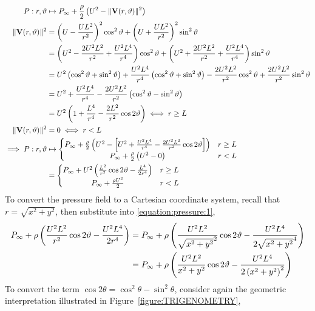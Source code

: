 \begin{align}
    \notag P:r,\theta&\mapsto P_\infty+\frac{\rho}{2}\left(U^2-\lVert\vec{V}(r,\theta)\rVert^2\right)\\
    \notag\lVert\vec{V}(r,\theta)\rVert^2&=\left(U-\frac{UL^2}{r^{2}}\right)^2\cos^2\theta+\left(U+\frac{UL^2}{r^{2}}\right)^2\sin^2\theta\\
    \notag&=\left(U^2-\frac{2U^2L^2}{r^2}+\frac{U^2L^4}{r^4}\right)\cos^2\theta+\left(U^2+\frac{2U^2L^2}{r^2}+\frac{U^2L^4}{r^4}\right)\sin^2\theta\\
    \notag&=U^2\left(\cos^2\theta+\sin^2\theta\right)+\frac{U^2L^4}{r^4}\left(\cos^2\theta+\sin^2\theta\right)-\frac{2U^2L^2}{r^2}\cos^2\theta+\frac{2U^2L^2}{r^2}\sin^2\theta\\
    \notag&=U^2+\frac{U^2L^4}{r^4}-\frac{2U^2L^2}{r^2}\left(\cos^2\theta-\sin^2\theta\right)\\
    \notag&=U^2\left(1+\frac{L^4}{r^4}-\frac{2L^2}{r^2}\cos2\theta\right)\iff r\geq L\\
    \notag\lVert\vec{V}(r,\theta)\rVert^2&=0\iff r<L\\
    \notag\implies P:r,\theta&\mapsto\left\{\begin{matrix}
        P_\infty+\frac{\rho}{2}\left(U^2-\left[U^2+\frac{U^2L^4}{r^4}-\frac{2U^2L^2}{r^2}\cos2\theta\right]\right) & r\geq L\\
        P_\infty+\frac{\rho}{2}\left(U^2-0\right) & r<L
    \end{matrix}\right.\\
    \label{equation:pressure:1}&=\left\{\begin{matrix}
        P_\infty+U^2\left(\frac{L^2}{r^2}\cos2\theta-\frac{L^4}{2r^4}\right) & r\geq L\\
        P_\infty+\frac{\rho U^2}{2} & r<L
    \end{matrix}\right.
\end{align}
To convert the pressure field to a Cartesian coordinate system, recall that $r=\sqrt{x^2+y^2}$, then substitute into \eqref{equation:pressure:1},
\begin{align}
    \notag P_\infty+\rho\left(\frac{U^2L^2}{r^2}\cos2\theta-\frac{U^2L^4}{2r^4}\right)&=P_\infty+\rho\left(\frac{U^2L^2}{\sqrt{x^2+y^2}^2}\cos2\theta-\frac{U^2L^4}{2\sqrt{x^2+y^2}^4}\right)\\
    \label{equation:pressure:2}&=P_\infty+\rho\left(\frac{U^2L^2}{x^2+y^2}\cos2\theta-\frac{U^2L^4}{2\left(x^2+y^2\right)^2}\right)
\end{align}
To convert the term $\cos2\theta=\cos^2\theta-\sin^2\theta$, consider again the geometric interpretation illustrated in Figure~\ref{figure:TRIGENOMETRY},
